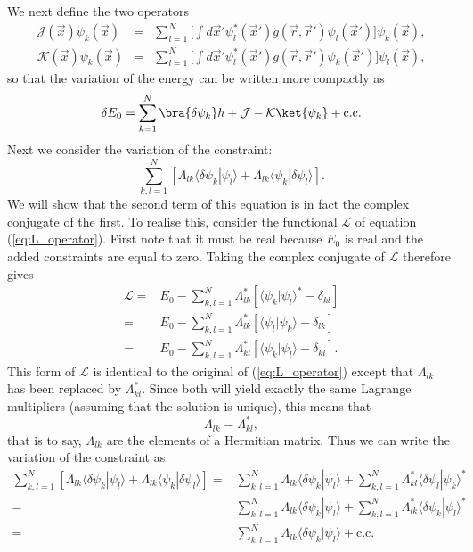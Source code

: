 We next define the two operators
\begin{eqnarray}
\label{eq:J_operator}
 \mathcal{J}(\vec x)\psi_k(\vec x) & = & \sum_{l=1}^N\Big[\int d\vec x' \psi^*_l(\vec x') g(\vec r, \vec r')\psi_l(\vec x')\Big]\psi_k(\vec x), \\ \label{eq:K_operator}
 \mathcal{K}(\vec x)\psi_k(\vec x) & = & \sum_{l=1}^N\Big[\int d\vec x' \psi^*_l(\vec x') g(\vec r, \vec r')\psi_k(\vec x')\Big]\psi_l(\vec x),
\end{eqnarray}
so that the variation of the energy can be written more compactly as
\begin{equation}
 \delta E_0 = \sum_{k=1}^N\bra{\delta \psi_k} h + \mathcal J - \mathcal K \ket{\psi_k} + \text{c.c.}
\end{equation}
Next we consider the variation of the constraint:
\begin{equation}
 \sum_{k,l=1}^N[\Lambda_{lk}\langle\delta\psi_k|\psi_l\rangle + \Lambda_{lk}\langle\psi_k|\delta\psi_l\rangle].
\end{equation}
We will show that the second term of this equation is in fact the complex conjugate of the first. To realise this, consider the functional $\mathscr L$
of equation (\ref{eq:L_operator}). First note that it must be real because $E_0$ is real and the added constraints are equal to zero.
Taking the complex conjugate of $\mathscr L$ therefore gives
\begin{equation}
\begin{split}
 \mathscr L = & E_0 - \sum_{k,l=1}^N\Lambda^*_{lk}[\langle\psi_k|\psi_l\rangle^* - \delta_{kl}] \\
            = & E_0 - \sum_{k,l=1}^N\Lambda^*_{lk}[\langle\psi_l|\psi_k\rangle - \delta_{lk}] \\
            = & E_0 - \sum_{k,l=1}^N\Lambda^*_{kl}[\langle\psi_k|\psi_l\rangle - \delta_{kl}].
\end{split}
\end{equation}
This form of $\mathscr L$ is identical to the original of (\ref{eq:L_operator}) except that $\Lambda_{lk}$ has been replaced by $\Lambda^*_{kl}$.
Since both will yield exactly the same Lagrange multipliers (assuming that the solution is unique), this means that
\begin{equation}
 \Lambda_{lk} = \Lambda^*_{kl},
\end{equation}
that is to say, $\Lambda_{lk}$ are the elements of a Hermitian matrix. Thus we can write the variation of the constraint as
\begin{equation}
\begin{split}
 \sum_{k,l=1}^N[\Lambda_{lk}\langle\delta\psi_k|\psi_l\rangle + \Lambda_{lk}\langle\psi_k|\delta\psi_l\rangle] = &
 \sum_{k,l=1}^N\Lambda_{lk}\langle\delta\psi_k|\psi_l\rangle + \sum_{k,l=1}^N\Lambda^*_{kl}\langle\delta\psi_l|\psi_k\rangle^* \\
= & \sum_{k,l=1}^N\Lambda_{lk}\langle\delta\psi_k|\psi_l\rangle + \sum_{k,l=1}^N\Lambda^*_{lk}\langle\delta\psi_k|\psi_l\rangle^* \\
= & \sum_{k,l=1}^N\Lambda_{lk}\langle\delta\psi_k|\psi_l\rangle + \text{c.c.}
\end{split}
\end{equation}
